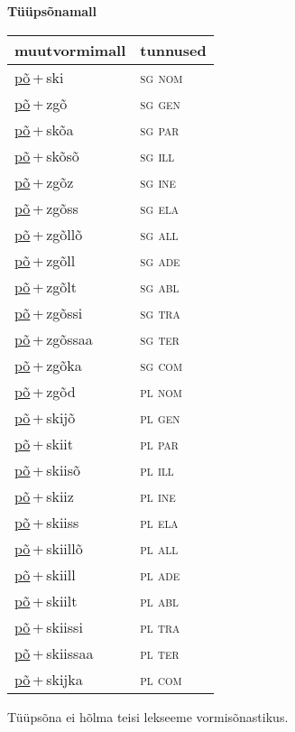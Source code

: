 
\vspace{1.8em}
\begin{minipage}{\textwidth}
\textbf{Tüüpsõnamall \,}\\

\begin{sideways}
\begin{tabular}{l l}
muutvormimall & tunnused \\
\hline
\underline{põ}\,+\,ski & \textsc{ sg nom } \\
\underline{põ}\,+\,zgõ & \textsc{ sg gen } \\
\underline{põ}\,+\,skõa & \textsc{ sg par } \\
\underline{põ}\,+\,skõsõ & \textsc{ sg ill } \\
\underline{põ}\,+\,zgõz & \textsc{ sg ine } \\
\underline{põ}\,+\,zgõss & \textsc{ sg ela } \\
\underline{põ}\,+\,zgõllõ & \textsc{ sg all } \\
\underline{põ}\,+\,zgõll & \textsc{ sg ade } \\
\underline{põ}\,+\,zgõlt & \textsc{ sg abl } \\
\underline{põ}\,+\,zgõssi & \textsc{ sg tra } \\
\underline{põ}\,+\,zgõssaa & \textsc{ sg ter } \\
\underline{põ}\,+\,zgõka & \textsc{ sg com } \\
\underline{põ}\,+\,zgõd & \textsc{ pl nom } \\
\underline{põ}\,+\,skijõ & \textsc{ pl gen } \\
\underline{põ}\,+\,skiit & \textsc{ pl par } \\
\underline{põ}\,+\,skiisõ & \textsc{ pl ill } \\
\underline{põ}\,+\,skiiz & \textsc{ pl ine } \\
\underline{põ}\,+\,skiiss & \textsc{ pl ela } \\
\underline{põ}\,+\,skiillõ & \textsc{ pl all } \\
\underline{põ}\,+\,skiill & \textsc{ pl ade } \\
\underline{põ}\,+\,skiilt & \textsc{ pl abl } \\
\underline{põ}\,+\,skiissi & \textsc{ pl tra } \\
\underline{põ}\,+\,skiissaa & \textsc{ pl ter } \\
\underline{põ}\,+\,skijka & \textsc{ pl com } \\
\end{tabular}
\end{sideways}
\label{tab:tüüpsõnamall-põski}

\end{minipage}

 
\vspace{1em}
\noindent Tüüpsõna ei hõlma teisi lekseeme vormi\-sõnastikus.
